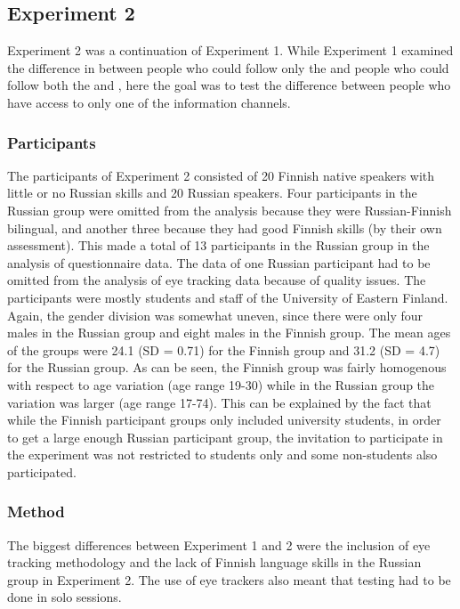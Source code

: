 \documentclass[output=paper]{langsci/langscibook}
\begin{document}
\subsection{Experiment 2}

Experiment 2 was a continuation of Experiment 1. While Experiment 1 examined the difference in  between people who could follow only the  and people who could follow both the  and , here the goal was to test the difference between people who have access to only one of the information channels. 

\subsubsection{Participants}

The participants of Experiment 2 consisted of 20 Finnish native speakers with little or no Russian skills and 20 Russian speakers. Four participants in the Russian group were omitted from the analysis because they were Russian-Finnish bilingual, and another three because they had good Finnish skills (by their own assessment). This made a total of 13 participants in the Russian group in the analysis of questionnaire data. The data of one Russian participant had to be omitted from the analysis of eye tracking data because of quality issues. The participants were mostly students and staff of the University of Eastern Finland. Again, the gender division was somewhat uneven, since there were only four males in the Russian group and eight males in the Finnish group. The mean ages of the groups were 24.1 (SD = 0.71) for the Finnish group and 31.2 (SD = 4.7) for the Russian group. As can be seen, the Finnish group was fairly homogenous with respect to age variation (age range 19-30) while in the Russian group the variation was larger (age range 17-74). This can be explained by the fact that while the Finnish participant groups only included university students, in order to get a large enough Russian participant group, the invitation to participate in the experiment was not restricted to students only and some non-students also participated. 

\subsubsection{Method}

The biggest differences between Experiment 1 and 2 were the inclusion of eye tracking methodology and the lack of Finnish language skills in the Russian group in Experiment 2. The use of eye trackers also meant that testing had to be done in solo sessions.
\end{document}
